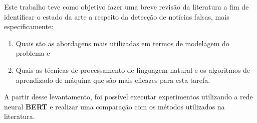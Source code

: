 Este trabalho teve como objetivo fazer uma breve revisão da literatura a fim de identificar o estado da arte a respeito da detecção de notícias falsas, mais especificamente: 
\begin{enumerate}
\item Quais são as abordagens mais utilizadas em termos de modelagem do problema e 
\item Quais as técnicas de processamento de linguagem natural e os algoritmos de aprendizado de máquina que são mais eficazes para esta tarefa.
   
\end{enumerate}
A partir desse levantamento, foi possível executar experimentos utilizando a rede neural \textbf{BERT} e realizar uma comparação com os métodos utilizados na literatura.





